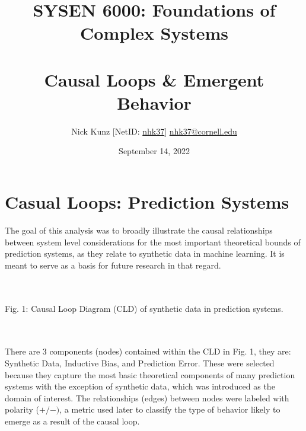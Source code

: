 \documentclass{article}
\begin{document}
\title{SYSEN 6000: Foundations of Complex Systems\\~\\
    \Large Causal Loops \& Emergent Behavior
}
\author{
    Nick Kunz [NetID: \url{nhk37}] \hyperlink{nhk37@cornell.edu}{nhk37@cornell.edu}}
\date{September 14, 2022}
\maketitle
\thispagestyle{fancy}

\section*{Casual Loops: Prediction Systems}
The goal of this analysis was to broadly illustrate the causal relationships between system level considerations for the most important theoretical bounds of prediction systems, as they relate to synthetic data in machine learning. It is meant to serve as a basis for future research in that regard.
    \begin{center}
        \\~\\
        \caption{Fig. 1: Causal Loop Diagram (CLD) of synthetic data in prediction systems.}
    \end{center}
\\~\\
There are 3 components (nodes) contained within the CLD in Fig. 1, they are: Synthetic Data, Inductive Bias, and Prediction Error. These were selected because they capture the most basic theoretical components of many prediction systems with the exception of synthetic data, which was introduced as the domain of interest. The relationships (edges) between nodes were labeled with polarity ($+/-)$, a metric used later to classify the type of behavior likely to emerge as a result of the causal loop. \\
\end{document}
